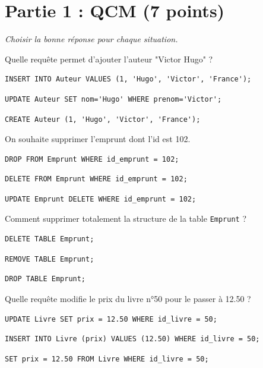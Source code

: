 \documentclass[a4paper, noanswers, addpoints, 12pt]{exam}
\begin{document}
\section{Partie 1 : QCM (7 points)}
\textit{Choisir la bonne réponse pour chaque situation.}

\begin{questions}

\question[1] Quelle requête permet d'ajouter l'auteur "Victor Hugo" ?
\begin{choices}
    \choice \begin{verbatim}
INSERT INTO Auteur VALUES (1, 'Hugo', 'Victor', 'France');
\end{verbatim}
    \choice \begin{verbatim}
UPDATE Auteur SET nom='Hugo' WHERE prenom='Victor';
\end{verbatim}
    \choice \begin{verbatim}
CREATE Auteur (1, 'Hugo', 'Victor', 'France');
\end{verbatim}
\end{choices}

\question[1] On souhaite supprimer l'emprunt dont l'id est 102.
\begin{choices}
    \choice \begin{verbatim}
DROP FROM Emprunt WHERE id_emprunt = 102;
\end{verbatim}
    \choice \begin{verbatim}
DELETE FROM Emprunt WHERE id_emprunt = 102;
\end{verbatim}
    \choice \begin{verbatim}
UPDATE Emprunt DELETE WHERE id_emprunt = 102;
\end{verbatim}
\end{choices}

\question[1] Comment supprimer totalement la structure de la table \texttt{Emprunt} ?
\begin{choices}
    \choice \begin{verbatim}
DELETE TABLE Emprunt;
\end{verbatim}
    \choice \begin{verbatim}
REMOVE TABLE Emprunt;
\end{verbatim}
    \choice \begin{verbatim}
DROP TABLE Emprunt;
\end{verbatim}
\end{choices}

\question[1] Quelle requête modifie le prix du livre n°50 pour le passer à 12.50 ?
\begin{choices}
    \choice \begin{verbatim}
UPDATE Livre SET prix = 12.50 WHERE id_livre = 50;
\end{verbatim}
    \choice \begin{verbatim}
INSERT INTO Livre (prix) VALUES (12.50) WHERE id_livre = 50;
\end{verbatim}
    \choice \begin{verbatim}
SET prix = 12.50 FROM Livre WHERE id_livre = 50;
\end{verbatim}
\end{choices}


\end{questions}
\end{document}
